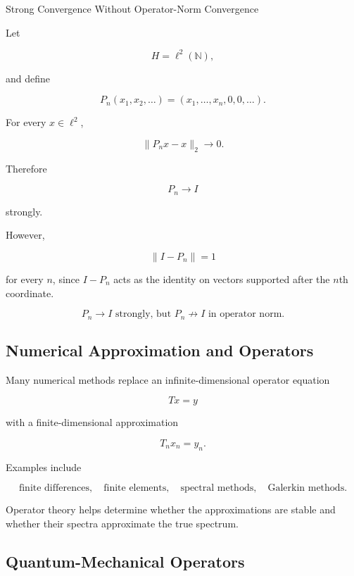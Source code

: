 \begin{workedexamplebox}{Strong Convergence Without Operator-Norm Convergence}

Let

\[
H=\ell^2(\mathbb{N}),
\]

and define

\[
P_n(x_1,x_2,\ldots)
=
(x_1,\ldots,x_n,0,0,\ldots).
\]

For every \(x\in\ell^2\),

\[
\|P_nx-x\|_2\to0.
\]

Therefore

\[
P_n\to I
\]

strongly.

However,

\[
\|I-P_n\|=1
\]

for every \(n\), since \(I-P_n\) acts as the identity on vectors supported
after the \(n\)th coordinate.

\begin{answerbox}
\[
\boxed{
P_n\to I
\text{ strongly, but }
P_n\not\to I
\text{ in operator norm}.
}
\]
\end{answerbox}
\end{workedexamplebox}

\subsection{Numerical Approximation and Operators}
\label{subsec:numerical-operator-approximation}

Many numerical methods replace an infinite-dimensional operator equation

\[
\boxed{
Tx=y
}
\]

with a finite-dimensional approximation

\[
\boxed{
T_nx_n=y_n.
}
\]

Examples include

\[
\boxed{
\text{finite differences},
\quad
\text{finite elements},
\quad
\text{spectral methods},
\quad
\text{Galerkin methods}.
}
\]

Operator theory helps determine whether the approximations are stable and
whether their spectra approximate the true spectrum.

\subsection{Quantum-Mechanical Operators}
\label{subsec:quantum-operators}

